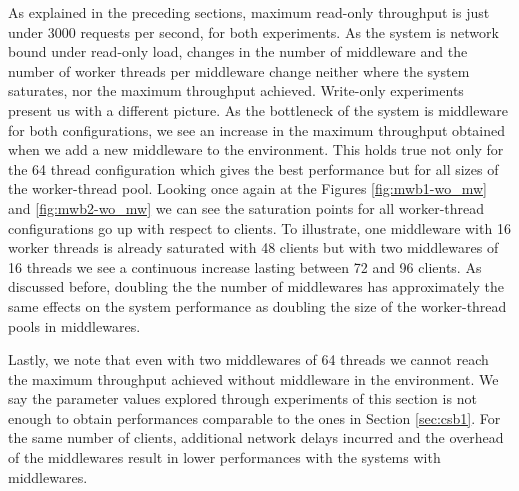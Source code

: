 \documentclass[11pt,a4paper]{article}
\begin{document}
\par As explained in the preceding sections, maximum read-only throughput is just under 3000 requests per second, for both experiments. As the system is network bound under read-only load, changes in the number of middleware and the number of worker threads per middleware change neither where the system saturates, nor the maximum throughput achieved. Write-only experiments present us with a different picture. As the bottleneck of the system is middleware for both configurations, we see an increase in the maximum throughput obtained when we add a new middleware to the environment. This holds true not only for the 64 thread configuration which gives the best performance but for all sizes of the worker-thread pool. Looking once again at the Figures \ref{fig:mwb1-wo_mw} and \ref{fig:mwb2-wo_mw} we can see the saturation points for all worker-thread configurations go up with respect to clients. To illustrate, one middleware with 16 worker threads is already saturated with 48 clients but with two middlewares of 16 threads we see a continuous increase lasting between 72 and 96 clients. As discussed before, doubling the the number of middlewares has approximately the same effects on the system performance as doubling the size of the worker-thread pools in middlewares.
\par Lastly, we note that even with two middlewares of 64 threads we cannot reach the maximum throughput achieved without middleware in the environment. We say the parameter values explored through experiments of this section is not enough to obtain performances comparable to the ones in Section \ref{sec:csb1}. For the same number of clients, additional network delays incurred and the overhead of the middlewares result in lower performances with the systems with middlewares.
\end{document}
